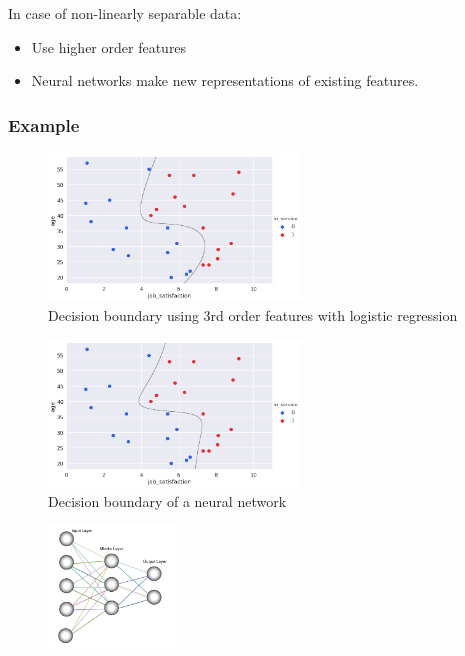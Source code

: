 \documentclass{article}
\begin{document}
In case of non-linearly separable data:

\begin{itemize}
    \item Use higher order features
    \item Neural networks make new representations of existing features.
\end{itemize}


\subsubsection{Example}

\begin{figure}[H]
    \centering
    \includegraphics[width=0.6\textwidth]{img/decision-boundary-logreg.png}
    \caption{Decision boundary using 3rd order features with logistic regression}
\end{figure}

\begin{figure}[H]
    \centering
    \includegraphics[width=0.6\textwidth]{img/decision-boundary-nn.png}
    \caption{Decision boundary of a neural network}
\end{figure}


\begin{figure}[H]
    \centering
    \includegraphics[width=0.3\textwidth]{img/properties-nn.png}
\end{figure}
\end{document}
